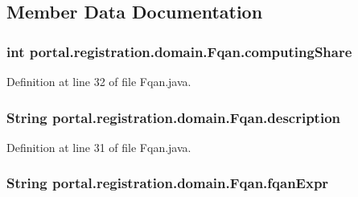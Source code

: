 \subsection{Member Data Documentation}
\hypertarget{classportal_1_1registration_1_1domain_1_1Fqan_a05ebf08182a037b4cbb4b27053e76ebc}{
\subsubsection[{computingShare}]{\setlength{\rightskip}{0pt plus 5cm}int {\bf portal.registration.domain.Fqan.computingShare}}}
\label{classportal_1_1registration_1_1domain_1_1Fqan_a05ebf08182a037b4cbb4b27053e76ebc}


Definition at line 32 of file Fqan.java.

\hypertarget{classportal_1_1registration_1_1domain_1_1Fqan_a75b560547e2591fb42c279e8b1bcc782}{
\subsubsection[{description}]{\setlength{\rightskip}{0pt plus 5cm}String {\bf portal.registration.domain.Fqan.description}}}
\label{classportal_1_1registration_1_1domain_1_1Fqan_a75b560547e2591fb42c279e8b1bcc782}


Definition at line 31 of file Fqan.java.

\hypertarget{classportal_1_1registration_1_1domain_1_1Fqan_a8fee3ab195a29cf4e56f5b7ea9226e3a}{
\subsubsection[{fqanExpr}]{\setlength{\rightskip}{0pt plus 5cm}String {\bf portal.registration.domain.Fqan.fqanExpr}}}
\label{classportal_1_1registration_1_1domain_1_1Fqan_a8fee3ab195a29cf4e56f5b7ea9226e3a}


